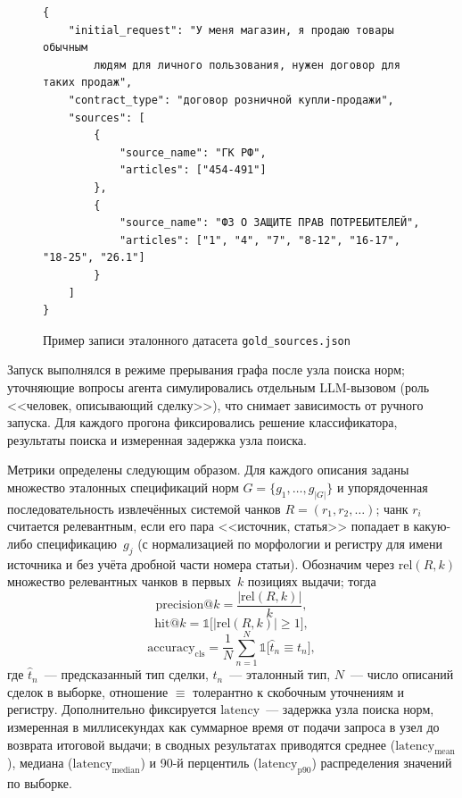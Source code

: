 \begin{figure}[H]
\begin{lstlisting}[style=promptstyle, language={}]
{
    "initial_request": "У меня магазин, я продаю товары обычным
        людям для личного пользования, нужен договор для таких продаж",
    "contract_type": "договор розничной купли-продажи",
    "sources": [
        {
            "source_name": "ГК РФ",
            "articles": ["454-491"]
        },
        {
            "source_name": "ФЗ О ЗАЩИТЕ ПРАВ ПОТРЕБИТЕЛЕЙ",
            "articles": ["1", "4", "7", "8-12", "16-17", "18-25", "26.1"]
        }
    ]
}
\end{lstlisting}
\caption{Пример записи эталонного датасета \texttt{gold\_sources.json}}
\label{fig:gold-sample}
\end{figure}

Запуск выполнялся в режиме прерывания графа после узла поиска норм; уточняющие вопросы агента симулировались отдельным LLM-вызовом (роль <<человек, описывающий сделку>>), что снимает зависимость от ручного запуска. Для каждого прогона фиксировались решение классификатора, результаты поиска и измеренная задержка узла поиска.

Метрики определены следующим образом. Для каждого описания заданы множество эталонных спецификаций норм $G = \{g_1, \dots, g_{|G|}\}$ и упорядоченная последовательность извлечённых системой чанков $R = (r_1, r_2, \dots)$; чанк $r_i$ считается релевантным, если его пара <<источник, статья>> попадает в какую-либо спецификацию~$g_j$ (с нормализацией по морфологии и регистру для имени источника и без учёта дробной части номера статьи). Обозначим через $\mathrm{rel}(R, k)$ множество релевантных чанков в первых~$k$ позициях выдачи; тогда
\begin{equation}
\mathrm{precision}@k = \frac{|\mathrm{rel}(R, k)|}{k},
\end{equation}
\begin{equation}
\mathrm{hit}@k = \mathbb{1}\bigl[|\mathrm{rel}(R, k)| \ge 1\bigr],
\end{equation}
\begin{equation}
\mathrm{accuracy}_{\mathrm{cls}} = \frac{1}{N}\sum_{n=1}^{N}\mathbb{1}\bigl[\hat{t}_n \equiv t_n\bigr],
\end{equation}
где $\hat{t}_n$~--- предсказанный тип сделки, $t_n$~--- эталонный тип, $N$~--- число описаний сделок в выборке, отношение $\equiv$ толерантно к скобочным уточнениям и регистру. Дополнительно фиксируется $\mathrm{latency}$~--- задержка узла поиска норм, измеренная в миллисекундах как суммарное время от подачи запроса в узел до возврата итоговой выдачи; в сводных результатах приводятся среднее ($\mathrm{latency}_{\mathrm{mean}}$), медиана ($\mathrm{latency}_{\mathrm{median}}$) и 90-й перцентиль ($\mathrm{latency}_{\mathrm{p90}}$) распределения значений по выборке.

